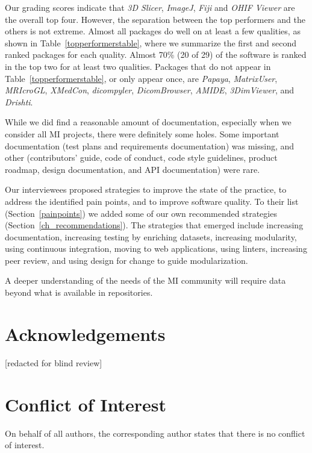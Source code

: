 \documentclass[doubleblind,12pt, 3p, times]{elsarticle}
\begin{document}
Our grading scores indicate that \textit{3D Slicer}, \textit{ImageJ},
\textit{Fiji} and \textit{OHIF Viewer} are the overall top four.  However, the
separation between the top performers and the others is not extreme.  Almost all
packages do well on at least a few qualities, as shown in
Table~\ref{topperformerstable}, where we summarize the first and second ranked
packages for each quality. Almost 70\% (20 of 29) of the software 
is ranked in the top two for at least two qualities.  Packages that do not
appear in Table~\ref{topperformerstable}, or only appear once, are
\textit{Papaya}, \textit{MatrixUser}, \textit{MRIcroGL}, \textit{XMedCon},
\textit{dicompyler}, \textit{DicomBrowser}, \textit{AMIDE}, \textit{3DimViewer},
and \textit{Drishti}.

While we did find a reasonable amount of documentation, especially when we
consider all MI projects, there were definitely some holes. Some important
documentation (test plans and requirements documentation) was missing, and other
(contributors' guide, code of conduct, code style guidelines, product roadmap,
design documentation, and API documentation) were rare.

Our interviewees proposed strategies to improve the state of the practice, to
address the identified pain points, and to improve software quality. To their
list (Section~\ref{painpoints}) we added some of our own recommended strategies
(Section~\ref{ch_recommendations}). The strategies that emerged include
increasing documentation, increasing testing by enriching datasets, increasing
modularity, using continuous integration, moving to web applications, using
linters, increasing peer review, and using design for change to guide
modularization.

A deeper understanding of the needs of the MI community will require data beyond
what is available in repositories.

\section*{Acknowledgements}

[redacted for blind review]

\section*{Conflict of Interest}

On behalf of all authors, the corresponding author states that there is no
conflict of interest.



\end{document}
